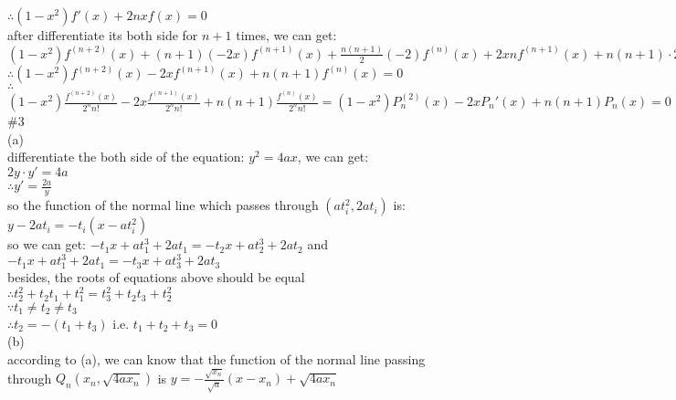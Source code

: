 \documentclass{article}
\begin{document}
$\therefore$\qquad$(1-x^2)f'(x)+2nxf(x)=0$\\

after differentiate its both side for $n+1$ times, we can get:\\

$(1-x^2)f^{(n+2)}(x)+(n+1)(-2x)f^{(n+1)}(x)+\displaystyle\frac{n(n+1)}{2}(-2)f^{(n)}(x)+2xnf^{(n+1)}(x)+n(n+1)\cdot2f^{(n)}(x)=0$\\

$\therefore$\qquad$(1-x^2)f^{(n+2)}(x)-2xf^{(n+1)}(x)+n(n+1)f^{(n)}(x)=0$\\

$\therefore$\qquad$\displaystyle(1-x^2)\frac{f^{(n+2)}(x)}{2^nn!}-2x\frac{f^{(n+1)}(x)}{2^nn!}+n(n+1)\frac{f^{(n)}(x)}{2^nn!}=(1-x^2)P_n^{(2)}(x)-2xP_n'(x)+n(n+1)P_n(x)=0$\\

\textcolor[rgb]{0.00,0.00,0.50}{\#3}\\

(a)\\

differentiate the both side of the equation: $y^2=4ax$, we can get:\\

$2y\cdot y'=4a$\\

$\therefore$\qquad$y'=\displaystyle\frac{2a}{y}$\\

so the function of the normal line which passes through $(at_i^2,2at_i)$ is: $y-2at_i=-t_i(x-at_i^2)$\\

so we can get: $-t_1x+at_1^3+2at_1=-t_2x+at_2^3+2at_2$ and $-t_1x+at_1^3+2at_1=-t_3x+at_3^3+2at_3$\\

besides, the roots of equations above should be equal\\

$\therefore$\qquad$t_2^2+t_2t_1+t_1^2=t_3^2+t_2t_3+t_2^2$\\

$\because$\qquad$t_1\neq t_2\neq t_3$\\

$\therefore$\qquad$t_2=-(t_1+t_3)$ i.e. $t_1+t_2+t_3=0$\\

(b)\\

according to (a), we can know that the function of the normal line passing through $Q_n(x_n,\sqrt{4ax_n})$ is $y=\displaystyle-\frac{\sqrt{x_n}}{\sqrt{a}}(x-x_n)+\sqrt{4ax_n}$\\
\end{document}
